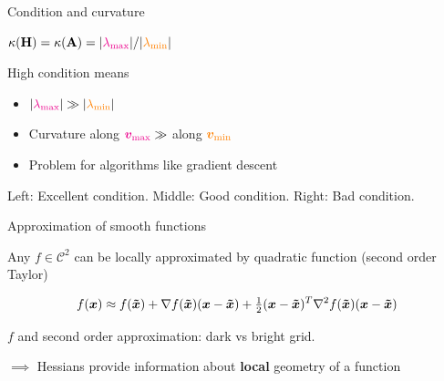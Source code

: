 \documentclass[11pt,compress,t,notes=noshow, xcolor=table]{beamer}
\begin{document}
\begin{framei}{Condition and curvature}
\item $\kappa(\mathbf{H}) = \kappa(\mathbf{A}) = |\textcolor{magenta}{\lambda_\text{max}}| / |\textcolor{orange}{\lambda_\text{min}}|$
\item High condition means
\begin{itemize}
\item $|\textcolor{magenta}{\lambda_\text{max}}| \gg |\textcolor{orange}{\lambda_\text{min}}|$
\item Curvature along $\textcolor{magenta}{\bm{v}_\text{max}} \gg$ along $\textcolor{orange}{\bm{v}_\text{min}}$
\item Problem for algorithms like gradient descent
\end{itemize}
\begin{center}\begin{footnotesize} Left: Excellent condition. Middle: Good condition. Right: Bad condition.\end{footnotesize}\end{center}
\end{framei}


\begin{framei}{Approximation of smooth functions}
\item Any $f \in \mathcal{C}^2$ can be locally approximated by quadratic function (second order Taylor)
\item[] \begin{equation*}
f(\bm{x}) \approx f(\bm{\tilde{x}}) + \nabla f(\bm{\tilde{x}})(\bm{x}-\bm{\tilde{x}}) + \tfrac 12(\bm{x}-\bm{\tilde{x}})^T\nabla^2 f(\bm{\tilde{x}})(\bm{x}-\bm{\tilde{x}})
\end{equation*}
\begin{center}\begin{footnotesize} $f$ and second order approximation: dark vs bright grid.\end{footnotesize}\end{center}
\item $\implies$ Hessians provide information about \textbf{local} geometry of a function
\end{framei}

\endlecture
\end{document}
